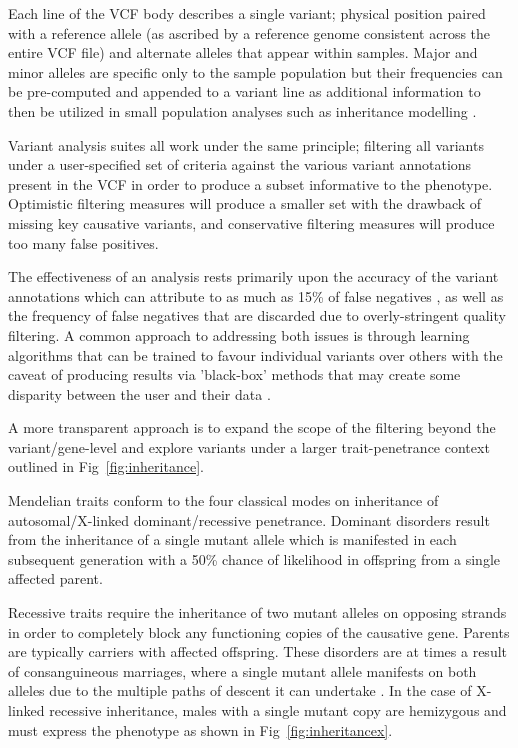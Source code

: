 Each line of the VCF body describes a single variant; physical position paired with a reference allele (as ascribed by a reference genome consistent across the entire VCF file) and alternate alleles that appear within samples. Major and minor alleles are specific only to the sample population but their frequencies can be pre-computed and appended to a variant line as additional information to then be utilized in small population analyses such as inheritance modelling \citep{danecek2011variant}.

Variant analysis suites all work under the same principle; filtering all variants under a user-specified set of criteria against the various variant annotations present in the VCF in order to produce a subset informative to the phenotype. Optimistic filtering measures will produce a smaller set with the drawback of missing key causative variants, and conservative filtering measures will produce too many false positives.

The effectiveness of an analysis rests primarily upon the accuracy of the variant annotations which can attribute to as much as 15\% of false negatives \citep{warden2014detailed}, as well as the frequency of false negatives that are discarded due to overly-stringent quality filtering. A common approach to addressing both issues is through learning algorithms that can be trained to favour individual variants over others with the caveat of producing results via 'black-box' methods that may create some disparity between the user and their data \citep{pabinger2014survey}. 

A more transparent approach is to expand the scope of the filtering beyond the variant/gene-level and explore variants under a larger trait-penetrance context outlined in Fig~\ref{fig:inheritance}.

Mendelian traits conform to the four classical modes on inheritance of autosomal/X-linked dominant/recessive penetrance. Dominant disorders result from the inheritance of a single mutant allele which is manifested in each subsequent generation with a 50\% chance of likelihood in offspring from a single affected parent.

Recessive traits require the inheritance of two mutant alleles on opposing strands in order to completely block any functioning copies of the causative gene. Parents are typically carriers with affected offspring. These disorders are at times a result of consanguineous marriages, where a single mutant allele manifests on both alleles due to the multiple paths of descent it can undertake \citep{kari2014consanguinity}. In the case of X-linked recessive inheritance, males with a single mutant copy are hemizygous and must express the phenotype as shown in Fig~\ref{fig:inheritancex}.

